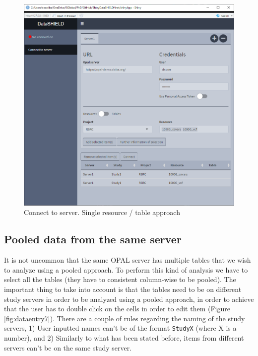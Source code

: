 \documentclass[
]{book}
\begin{document}
\begin{figure}

{\centering \includegraphics[width=12.68in]{images/data_entry6} 

}

\caption{Connect to server. Single resource / table approach}\label{fig:dataentry6}
\end{figure}

\hypertarget{pooled-data-from-the-same-server}{%
\subsection{Pooled data from the same server}\label{pooled-data-from-the-same-server}}

It is not uncommon that the same OPAL server has multiple tables that we wish to analyze using a pooled approach. To perform this kind of analysis we have to select all the tables (they have to consistent column-wise to be pooled). The important thing to take into account is that the tables need to be on different study servers in order to be analyzed using a pooled approach, in order to achieve that the user has to double click on the cells in order to edit them (Figure \ref{fig:dataentry7}). There are a couple of rules regarding the naming of the study servers, 1) User inputted names can't be of the format \texttt{StudyX} (where X is a number), and 2) Similarly to what has been stated before, items from different servers can't be on the same study server.
\end{document}
